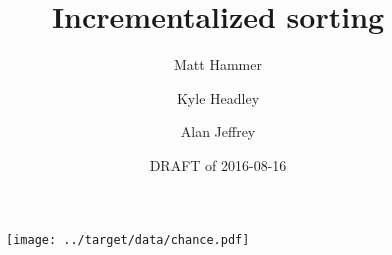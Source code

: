 \documentclass{article}
\title{Incrementalized sorting}
\author{Matt Hammer\and Kyle Headley\and Alan Jeffrey}
\date{DRAFT of 2016-08-16}
\begin{document}
\maketitle

\begin{figure}
  \centering
  \texttt{[image: ../target/data/chance.pdf]}
\end{figure}

\cite{servo}



\end{document}
